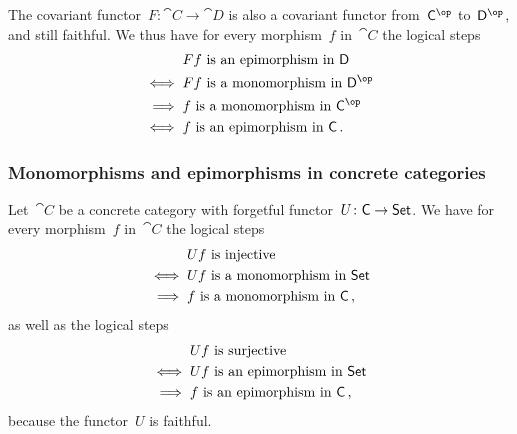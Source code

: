 The covariant functor~$F \colon \cat{C} \to \cat{D}$ is also a covariant
functor from~$\cat{C}^{\op}$ to~$\cat{D}^{\op}$, and still faithful.
We thus have for every morphism~$f$ in~$\cat{C}$ the logical steps
\begin{align*}
	{}&
	\text{$F f$ is an epimorphism in~$\cat{D}$}
	\\
	\iff{}&
	\text{$F f$ is a monomorphism in~$\cat{D}^{\op}$}
	\\
	\implies{}&
	\text{$f$ is a monomorphism in~$\cat{C}^{\op}$}
	\\
	\iff{}&
	\text{$f$ is an epimorphism in~$\cat{C}$} \,.
\end{align*}



\subsubsection*{Monomorphisms and epimorphisms in concrete categories}

Let~$\cat{C}$ be a concrete category with forgetful functor~$U \colon \mathsf{C} \to \mathsf{Set}$.
We have for every morphism~$f$ in~$\cat{C}$ the logical steps
\begin{align*}
	{}&
	\text{$U f$ is injective}
	\\
	\iff{}&
	\text{$U f$ is a monomorphism in~$\mathsf{Set}$}
	\\
	\implies{}&
	\text{$f$ is a monomorphism in~$\mathsf{C}$} \,,
\end{align*}
as well as the logical steps
\begin{align*}
	{}&
	\text{$U f$ is surjective}
	\\
	\iff{}&
	\text{$U f$ is an epimorphism in~$\mathsf{Set}$}
	\\
	\implies{}&
	\text{$f$ is an epimorphism in~$\mathsf{C}$} \,,
\end{align*}
because the functor~$U$ is faithful.
